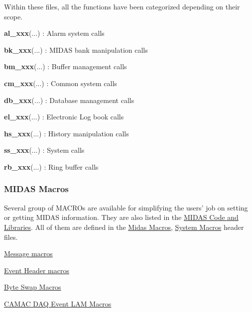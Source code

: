 Within these files, all the functions have been categorized depending on their scope.


\begin{DoxyItemize}
\item {\bfseries al\_\-xxx}(...) : Alarm system calls
\item {\bfseries bk\_\-xxx}(...) : MIDAS bank manipulation calls
\item {\bfseries bm\_\-xxx}(...) : Buffer management calls
\item {\bfseries cm\_\-xxx}(...) : Common system calls
\item {\bfseries db\_\-xxx}(...) : Database management calls
\item {\bfseries el\_\-xxx}(...) : Electronic Log book calls
\item {\bfseries hs\_\-xxx}(...) : History manipulation calls
\item {\bfseries ss\_\-xxx}(...) : System calls
\item {\bfseries rb\_\-xxx}(...) : Ring buffer calls
\end{DoxyItemize}

\label{F_Midas_Code_and_Libraries_midas_macro}
\hypertarget{F_Midas_Code_and_Libraries_midas_macro}{}
 

 \hypertarget{F_Midas_Code_and_Libraries_F_midas_macro}{}\subsubsection{MIDAS Macros}\label{F_Midas_Code_and_Libraries_F_midas_macro}
Several group of MACROs are available for simplifying the users' job on setting or getting MIDAS information. They are also listed in the \hyperlink{F_Midas_Code_and_Libraries_F_Midas_Library}{MIDAS Code and Libraries}. All of them are defined in the \hyperlink{group__mmacroh}{Midas Macros}, \hyperlink{group__msmacroh}{System Macros} header files.


\begin{DoxyItemize}
\item \hyperlink{F_Messaging_F_message_types}{Message macros}
\item \hyperlink{FE_bank_construction_FE_Midas_Event_Header_Macros}{Event Header macros}
\item \hyperlink{DataAnalysis_DA_Byte_Swap_Macros}{Byte Swap Macros}
\item \hyperlink{Frontend_code_FE_LAM_macros}{CAMAC DAQ Event LAM Macros}
\end{DoxyItemize}

